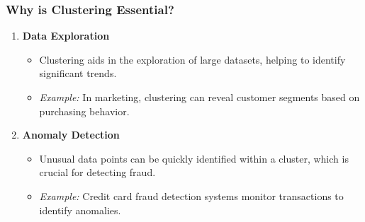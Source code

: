 \documentclass[aspectratio=169]{beamer}
\begin{document}
\begin{frame}[fragile]
    \frametitle{Why is Clustering Essential?}
    \begin{enumerate}
        \item \textbf{Data Exploration}
        \begin{itemize}
            \item Clustering aids in the exploration of large datasets, helping to identify significant trends.
            \item \textit{Example:} In marketing, clustering can reveal customer segments based on purchasing behavior.
        \end{itemize}
        
        \item \textbf{Anomaly Detection}
        \begin{itemize}
            \item Unusual data points can be quickly identified within a cluster, which is crucial for detecting fraud.
            \item \textit{Example:} Credit card fraud detection systems monitor transactions to identify anomalies.
        \end{itemize}
    \end{enumerate}
\end{frame}
\end{document}
